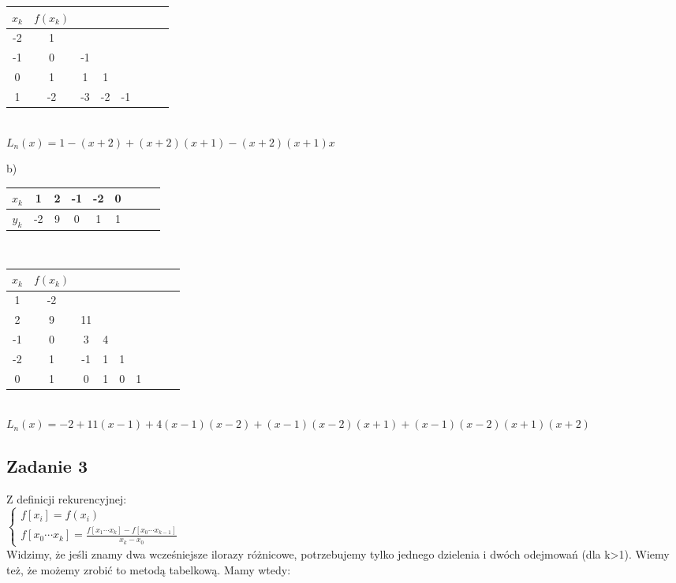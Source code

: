 \documentclass[a4paper]{article}
\begin{document}
\begin{tabular}{|c *{6}{|c} |c|}\hline
$x_k$ & $f(x_k)$ &  &  & \\
 & 1 &  &  &  \\
 & 0 & -1 &  & \\
 & 1 & 1 & 1 & \\
 & -2  & -3  & -2 & -1 \\
\hline
\end{tabular}\\

$L_n(x)=1-(x+2)+(x+2)(x+1)-(x+2)(x+1)x$

\clearpage
b)
\begin{tabular}{|c| *{7}{|c} |c|}\hline
$x_k$ & 1 & 2 & -1 & -2 & 0\\
\hline 
$y_k$ & -2  & 9 & 0 & 1 & 1 \\
\hline
\end{tabular}\\

\begin{tabular}{|c| *{7}{|c} |c|}\hline
$x_k$ & $f(x_k)$ & & & & \\
 & -2 &  &  &  &\\
 & 9 & 11 &  & &\\
 & 0 & 3 & 4 & &\\
 & 1  & -1  & 1 & 1 & \\
 & 1  & 0 & 1 & 0 & 1\\
\hline
\end{tabular}\\

$L_n(x)=-2+11(x-1)+4(x-1)(x-2)+(x-1)(x-2)(x+1)+(x-1)(x-2)(x+1)(x+2)$

\subsection*{Zadanie 3}
Z definicji rekurencyjnej:\\
$\left\{\begin{matrix}
f[x_i]=f(x_i)\\ 
f[x_0\cdots x_k] = \frac{f[x_1\cdots x_k] - f[x_0\cdots x_{k-1}]}{x_k-x_0}
\end{matrix}\right.
$\\
Widzimy, że jeśli znamy dwa wcześniejsze ilorazy różnicowe, potrzebujemy tylko jednego dzielenia i dwóch odejmowań (dla k>1). Wiemy też, że możemy zrobić to metodą tabelkową. Mamy wtedy:\\ 
\end{document}
